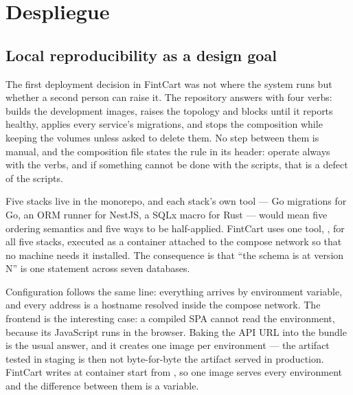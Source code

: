 \section{Despliegue}


\subsection{Local reproducibility as a design goal}

The first deployment decision in FintCart was not where the system runs but whether a second person
can raise it. The repository answers with four verbs:  builds the development images,
 raises the topology and blocks until it reports healthy,  applies every
service's migrations, and  stops the composition while keeping the volumes unless asked
to delete them. No step between them is manual, and the composition file states the rule in its header: operate always
with the verbs, and if something cannot be done with the scripts, that is a defect of the scripts.

Five stacks live in the monorepo, and each stack's own tool — Go migrations for Go, an ORM runner for
NestJS, a SQLx macro for Rust — would mean five ordering semantics and five ways to be half-applied. FintCart uses one tool, , for all five stacks, executed as a
container attached to the compose network so that no machine needs it installed. The consequence is
that \enquote{the schema is at version N} is one statement across seven databases.

Configuration follows the same line: everything arrives by environment variable, and every address is
a hostname resolved inside the compose network. The frontend is the interesting case: a compiled SPA
cannot read the environment, because its JavaScript runs in the browser. Baking the API URL into the
bundle is the usual answer, and it creates one image per environment — the artifact tested in staging
is then not byte-for-byte the artifact served in production. FintCart writes  at
container start from , so one image serves every environment and the difference
between them is a variable.

